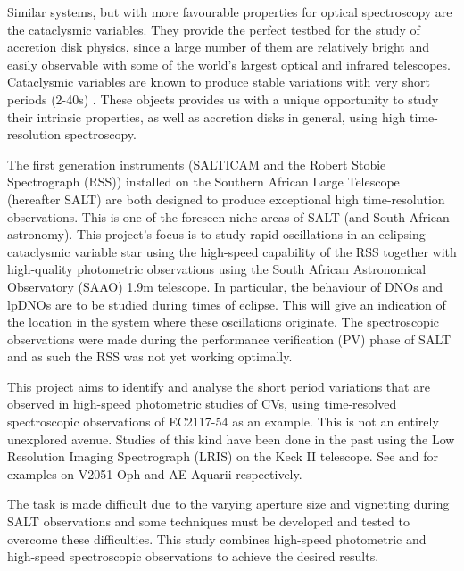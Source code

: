 Similar systems, but with more favourable properties for optical spectroscopy are the cataclysmic variables. They provide the perfect testbed for the study of accretion disk physics, since a large number of them are relatively bright and easily observable with some of the world's largest optical and infrared telescopes. Cataclysmic variables are known to produce stable variations with very short periods (2-40s) \citep{warnerbible}. These objects provides us with a unique opportunity to study their intrinsic properties, as well as accretion disks in general, using high time-resolution spectroscopy.

The first generation instruments (SALTICAM and the Robert Stobie Spectrograph (RSS)) installed on the Southern African Large Telescope (hereafter SALT)  are both designed to produce exceptional high time-resolution observations. This is one of the foreseen niche areas of SALT (and South African astronomy). This project's focus is to study rapid oscillations in an eclipsing cataclysmic variable star using the high-speed capability of the RSS together with high-quality photometric observations using the South African Astronomical Observatory (SAAO) 1.9m telescope. In particular, the behaviour of DNOs and lpDNOs are to be studied during times of eclipse. This will give an indication of the location in the system where these oscillations originate. The spectroscopic observations were made during the performance verification (PV) phase  of SALT and as such the RSS was not yet working optimally.



This project aims to identify and analyse the short period variations that are observed in high-speed photometric studies of CVs, using time-resolved spectroscopic observations of EC2117-54 as an example. This is not an entirely unexplored avenue. Studies of this kind have been done in the past using the Low Resolution Imaging Spectrograph (LRIS) on the Keck II telescope. See \cite{V2051Oph2001} and \cite{AEAqu2003} for examples on V2051 Oph and AE Aquarii respectively.

The task is made difficult due to the varying aperture size and vignetting during SALT observations and some techniques must be developed and tested to overcome these difficulties. This study combines high-speed photometric and high-speed spectroscopic observations to achieve the desired results.




